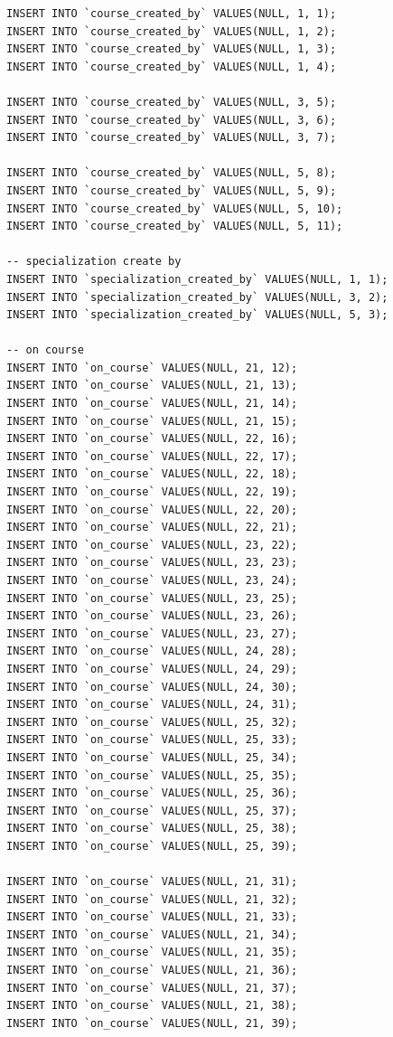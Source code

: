 \documentclass[12pt,a4paper,titlepage]{article}
\begin{document}
\begin{lstlisting}
INSERT INTO `course_created_by` VALUES(NULL, 1, 1);
INSERT INTO `course_created_by` VALUES(NULL, 1, 2);
INSERT INTO `course_created_by` VALUES(NULL, 1, 3);
INSERT INTO `course_created_by` VALUES(NULL, 1, 4);

INSERT INTO `course_created_by` VALUES(NULL, 3, 5);
INSERT INTO `course_created_by` VALUES(NULL, 3, 6);
INSERT INTO `course_created_by` VALUES(NULL, 3, 7);

INSERT INTO `course_created_by` VALUES(NULL, 5, 8);
INSERT INTO `course_created_by` VALUES(NULL, 5, 9);
INSERT INTO `course_created_by` VALUES(NULL, 5, 10);
INSERT INTO `course_created_by` VALUES(NULL, 5, 11);

-- specialization create by
INSERT INTO `specialization_created_by` VALUES(NULL, 1, 1);
INSERT INTO `specialization_created_by` VALUES(NULL, 3, 2);
INSERT INTO `specialization_created_by` VALUES(NULL, 5, 3);

-- on course
INSERT INTO `on_course` VALUES(NULL, 21, 12);
INSERT INTO `on_course` VALUES(NULL, 21, 13);
INSERT INTO `on_course` VALUES(NULL, 21, 14);
INSERT INTO `on_course` VALUES(NULL, 21, 15);
INSERT INTO `on_course` VALUES(NULL, 22, 16);
INSERT INTO `on_course` VALUES(NULL, 22, 17);
INSERT INTO `on_course` VALUES(NULL, 22, 18);
INSERT INTO `on_course` VALUES(NULL, 22, 19);
INSERT INTO `on_course` VALUES(NULL, 22, 20);
INSERT INTO `on_course` VALUES(NULL, 22, 21);
INSERT INTO `on_course` VALUES(NULL, 23, 22);
INSERT INTO `on_course` VALUES(NULL, 23, 23);
INSERT INTO `on_course` VALUES(NULL, 23, 24);
INSERT INTO `on_course` VALUES(NULL, 23, 25);
INSERT INTO `on_course` VALUES(NULL, 23, 26);
INSERT INTO `on_course` VALUES(NULL, 23, 27);
INSERT INTO `on_course` VALUES(NULL, 24, 28);
INSERT INTO `on_course` VALUES(NULL, 24, 29);
INSERT INTO `on_course` VALUES(NULL, 24, 30);
INSERT INTO `on_course` VALUES(NULL, 24, 31);
INSERT INTO `on_course` VALUES(NULL, 25, 32);
INSERT INTO `on_course` VALUES(NULL, 25, 33);
INSERT INTO `on_course` VALUES(NULL, 25, 34);
INSERT INTO `on_course` VALUES(NULL, 25, 35);
INSERT INTO `on_course` VALUES(NULL, 25, 36);
INSERT INTO `on_course` VALUES(NULL, 25, 37);
INSERT INTO `on_course` VALUES(NULL, 25, 38);
INSERT INTO `on_course` VALUES(NULL, 25, 39);

INSERT INTO `on_course` VALUES(NULL, 21, 31);
INSERT INTO `on_course` VALUES(NULL, 21, 32);
INSERT INTO `on_course` VALUES(NULL, 21, 33);
INSERT INTO `on_course` VALUES(NULL, 21, 34);
INSERT INTO `on_course` VALUES(NULL, 21, 35);
INSERT INTO `on_course` VALUES(NULL, 21, 36);
INSERT INTO `on_course` VALUES(NULL, 21, 37);
INSERT INTO `on_course` VALUES(NULL, 21, 38);
INSERT INTO `on_course` VALUES(NULL, 21, 39);


\end{lstlisting}
\end{document}
